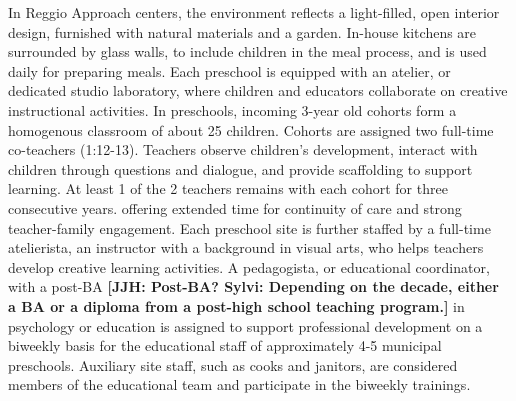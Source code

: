 In Reggio Approach centers, the environment reflects a light-filled, open interior design, furnished with natural materials and a garden. In-house kitchens are surrounded by glass walls, to include children in the meal process, and is used daily for preparing meals. Each preschool is equipped with an atelier, or dedicated studio laboratory, where children and educators collaborate on creative instructional activities. In preschools, incoming 3-year old cohorts form a homogenous classroom of about 25 children. Cohorts are assigned two full-time co-teachers (1:12-13). Teachers observe children's development, interact with children through questions and dialogue, and provide scaffolding to support learning. At least 1 of the 2 teachers remains with each cohort for three consecutive years. offering extended time for continuity of care and strong teacher-family engagement. Each preschool site is further staffed by a full-time atelierista, an instructor with a background in visual arts, who helps teachers develop creative learning activities. A pedagogista, or educational coordinator, with a post-BA \textbf{[JJH: Post-BA? Sylvi: Depending on the decade, either a BA or a diploma from a post-high school teaching program.]} in psychology or education is assigned to support professional development on a biweekly basis for the educational staff of approximately 4-5 municipal preschools. Auxiliary site staff, such as cooks and janitors, are considered members of the educational team and participate in the biweekly trainings.

